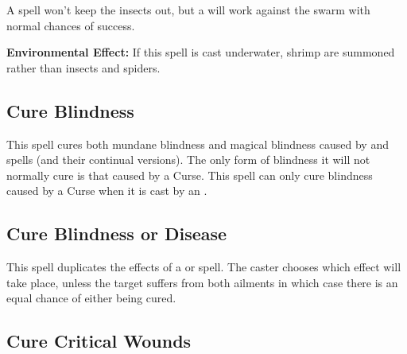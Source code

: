 \begin{multicols*}{2}
A  spell won’t keep the insects out, but a  will work against the swarm with normal chances of success.

\textbf{Environmental Effect:} If this spell is cast underwater, shrimp are summoned rather than insects and spiders.

\subsection{Cure Blindness}\label{spell:Cure Blindness}

This spell cures both mundane blindness and magical blindness caused by  and  spells (and their continual versions). The only form of blindness it will not normally cure is that caused by a Curse. This spell can only cure blindness caused by a Curse when it is cast by an .

\subsection{Cure Blindness or Disease}\label{spell:Cure Blindness or Disease}

This spell duplicates the effects of a  or  spell. The caster chooses which effect will take place, unless the target suffers from both ailments in which case there is an equal chance of either being cured.

\subsection{Cure Critical Wounds}\label{spell:Cure Critical Wounds}
\end{multicols*}
